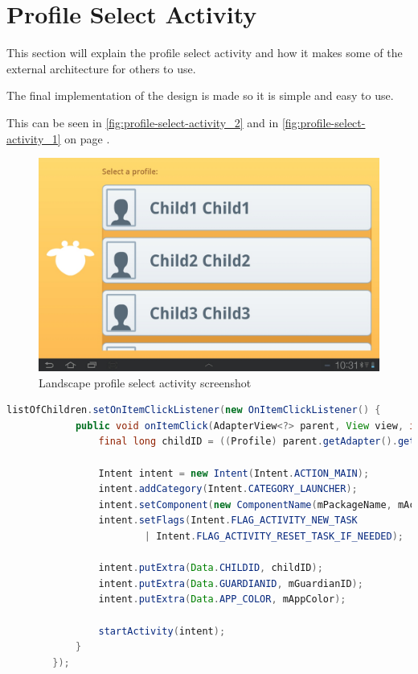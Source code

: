\section{Profile Select Activity}
This section will explain the profile select activity and how it makes some of the external architecture for others to use.

The final implementation of the design is made so it is simple and easy to use. 

This can be seen in \autoref{fig:profile-select-activity_2} and in \autoref{fig:profile-select-activity_1} on page \pageref{fig:profile-select-activity_1}.

\begin{figure}[h!]
	\centering
	\includegraphics[scale=0.3]{gfx/profile-select-activity_2.jpg}
	\caption{Landscape profile select activity screenshot}
	\label{fig:profile-select-activity_2}
\end{figure}

\begin{lstlisting}[style=sourceCode, language=JAVA, caption=How the launcher shares different ids and color through the profile select activity, label=lst:profileActivity] 
listOfChildren.setOnItemClickListener(new OnItemClickListener() {
			public void onItemClick(AdapterView<?> parent, View view, int position, long id) {
				final long childID = ((Profile) parent.getAdapter().getItem(position)).getId();

				Intent intent = new Intent(Intent.ACTION_MAIN);
				intent.addCategory(Intent.CATEGORY_LAUNCHER);
				intent.setComponent(new ComponentName(mPackageName, mActivityName));
				intent.setFlags(Intent.FLAG_ACTIVITY_NEW_TASK
						| Intent.FLAG_ACTIVITY_RESET_TASK_IF_NEEDED);

				intent.putExtra(Data.CHILDID, childID);
				intent.putExtra(Data.GUARDIANID, mGuardianID);
				intent.putExtra(Data.APP_COLOR, mAppColor);

				startActivity(intent);
			}
		});
\end{lstlisting}